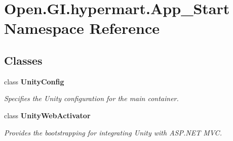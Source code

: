\section{Open.\+G\+I.\+hypermart.\+App\+\_\+\+Start Namespace Reference}
\label{namespace_open_1_1_g_i_1_1hypermart_1_1_app___start}
\subsection*{Classes}
\begin{DoxyCompactItemize}
\item 
class \textbf{ Unity\+Config}
\begin{DoxyCompactList}\small\item\em Specifies the Unity configuration for the main container. \end{DoxyCompactList}\item 
class {\bfseries Unity\+Web\+Activator}
\begin{DoxyCompactList}\small\item\em Provides the bootstrapping for integrating Unity with A\+S\+P.\+N\+ET M\+VC.\end{DoxyCompactList}\end{DoxyCompactItemize}
